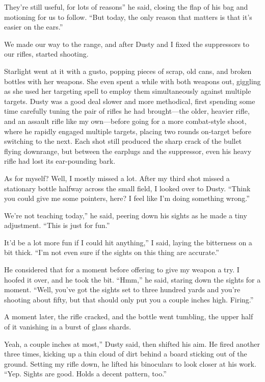\leavevmode{}They’re still useful, for lots of reasons” he said, closing the flap of his bag and motioning for us to follow. “But today, the only reason that matters is that it’s easier on the ears.”

We made our way to the range, and after Dusty and I fixed the suppressors to our rifles, started shooting.

Starlight went at it with a gusto, popping pieces of scrap, old cans, and broken bottles with her weapons. She even spent a while with both weapons out, giggling as she used her targeting spell to employ them simultaneously against multiple targets. Dusty was a good deal slower and more methodical, first spending some time carefully tuning the pair of rifles he had brought—the older, heavier rifle, and an assault rifle like my own—before going for a more combat-style shoot, where he rapidly engaged multiple targets, placing two rounds on-target before switching to the next. Each shot still produced the sharp crack of the bullet flying downrange, but between the earplugs and the suppressor, even his heavy rifle had lost its ear-pounding bark.

As for myself? Well, I mostly missed a lot. After my third shot missed a stationary bottle halfway across the small field, I looked over to Dusty. “Think you could give me some pointers, here? I feel like I’m doing something wrong.”

\leavevmode{}We’re not teaching today,” he said, peering down his sights as he made a tiny adjustment. “This is just for fun.”

\leavevmode{}It’d be a lot more fun if I could hit anything,” I said, laying the bitterness on a bit thick. “I’m not even sure if the sights on this thing are accurate.”

He considered that for a moment before offering to give my weapon a try. I hoofed it over, and he took the bit. “Hmm,” he said, staring down the sights for a moment. “Well, you’ve got the sights set to three hundred yards and you’re shooting about fifty, but that should only put you a couple inches high. Firing.”

A moment later, the rifle cracked, and the bottle went tumbling, the upper half of it vanishing in a burst of glass shards.

\leavevmode{}Yeah, a couple inches at most,” Dusty said, then shifted his aim. He fired another three times, kicking up a thin cloud of dirt behind a board sticking out of the ground. Setting my rifle down, he lifted his binoculars to look closer at his work. “Yep. Sights are good. Holds a decent pattern, too.”


